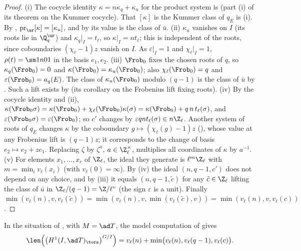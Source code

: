 \begin{proof}
(i) The cocycle identity $\kappa=n\kappa_q+\kappa_u$ for the product system is  (part (i) of its theorem on the Kummer cocycle). That $[\kappa]$ is the Kummer
class of $q_E$ is (i). By , $\operatorname{pr}_{\ur}[\kappa]=[\kappa_u]$, and by
 its value is the class of $\bar u$.
(ii) $\kappa_u$ vanishes on $I$ (its roots lie in $\Q_q^{\ur}$) and $\kappa_q|_I=t_\ell$, so $\kappa|_I=nt_\ell$; this is independent of the roots, since coboundaries
$(\chi_\ell-1)z$ vanish on $I$. As $\varepsilon|_I=1$ and $\chi_\ell|_I=1$, $\rho(t)=\sm1{n}01$ in the basis $e_1,e_2$.
(iii) $\Frob_0$ fixes the chosen roots of $q$, so $\kappa_q(\Frob_0)=0$ and $\kappa(\Frob_0)=\kappa_u(\Frob_0)$; also $\chi_\ell(\Frob_0)=q$ and $\varepsilon(\Frob_0)=a_q(E)$.
The class of $\kappa_u(\Frob_0)$ modulo $(q-1)$ is the class of $\bar u$ by . Such a lift exists by  (its corollary on
the Frobenius lift fixing roots).
(iv) By the cocycle identity and (ii), $\kappa(\Frob_0\sigma)=\kappa(\Frob_0)+\chi_\ell(\Frob_0)\kappa(\sigma)=\kappa(\Frob_0)+q\,n\,t_\ell(\sigma)$, and $\varepsilon(\Frob_0\sigma)=\varepsilon(\Frob_0)$; so
$c'$ changes by $\varepsilon qnt_\ell(\sigma)\in n\Z_\ell$. Another system of roots of $q_E$ changes $\kappa$ by the coboundary $g\mapsto(\chi_\ell(g)-1)z$ (),
whose value at any Frobenius lift is $(q-1)z$; it corresponds to the change of basis $e_2\mapsto e_2+ze_1$. Replacing $\zeta$ by $\zeta^a$, $a\in\Z_\ell^\times$, multiplies all
coordinates of $\kappa$ by $a^{-1}$.
(v) For elements $x_1,\dots,x_r$ of $\Z_\ell$, the ideal they generate is $\ell^m\Z_\ell$ with $m=\min_iv_\ell(x_i)$ (with $v_\ell(0)=\infty$). By (iv) the ideal $(n,q-1,c')$
does not depend on any choice, and by (iii) it equals $(n,q-1,\tilde c)$ for any $\tilde c\in\Z_\ell$ lifting the class of $\bar u$ in $\Z_\ell/(q-1)=\Z/\ell^v$ (the sign
$\varepsilon$ is a unit). Finally $\min(v_\ell(n),v,v_\ell(\tilde c))=\min(v_\ell(n),v,\min(v_\ell(\tilde c),v))=\min(v_\ell(n),v,v_\ell(c))$.
\end{proof}

\begin{corollary}\label{cor:galcoh:tamfactor}
In the situation of , with $M=\ad T$, the model computation of  gives
\[
\len\Bigl(\bigl(H^1(I,\ad T)_{\tors}\bigr)^{G/I}\Bigr)=v_\ell(n)+\min\bigl(v_\ell(n),v_\ell(q-1),v_\ell(c)\bigr).
\]
\end{corollary}

